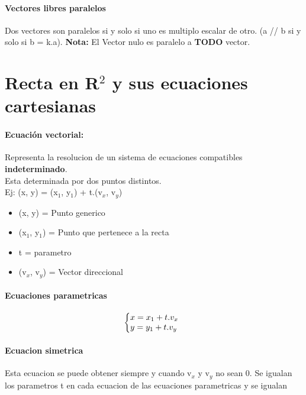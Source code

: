 \documentclass[11pt]{article}
\begin{document}
\paragraph{Vectores libres paralelos}
Dos vectores son paralelos si y solo si uno es multiplo escalar de otro. (a // b si y solo si b = k.a). \textbf{Nota:} El Vector nulo es paralelo a \textbf{TODO} vector.

\pagebreak

\section{Recta en R$^2$ y sus ecuaciones cartesianas}

\paragraph{Ecuación vectorial: }
Representa la resolucion de un sistema de ecuaciones compatibles \textbf{indeterminado}.\\ 
Esta determinada por dos puntos distintos.\\
Ej: (x, y) = (x$_1$, y$_1$) + t.(v$_x$, v$_y$)
\begin{itemize}
	\item (x, y) = Punto generico
	\item (x$_1$, y$_1$) = Punto que pertenece a la recta
	\item t = parametro
	\item (v$_x$, v$_y$) = Vector direccional
\end{itemize}

\paragraph{Ecuaciones parametricas}
\begin{equation*}
  \left\{
    \begin{array}{@{} l c @{}}
      x = x_1 +t.v_x \\
      y = y_1 +t.v_y
    \end{array}\right.
  \label{eq4}
\end{equation*}

\paragraph{Ecuacion simetrica} Esta ecuacion se puede obtener siempre y cuando v$_x$ y v$_y$ no sean 0. Se igualan los parametros t en cada ecuacion de las ecuaciones parametricas y se igualan
\end{document}
